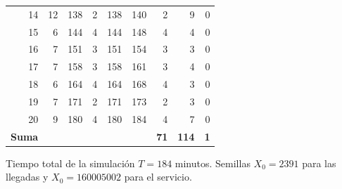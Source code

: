 \begin{table}[H]
\begin{tabular}{@{}rrrrrrrrr@{}}
14 & 12 & 138 & 2 & 138 & 140 & 2 & 9 & 0 \\
15 & 6 & 144 & 4 & 144 & 148 & 4 & 4 & 0 \\
16 & 7 & 151 & 3 & 151 & 154 & 3 & 3 & 0 \\
17 & 7 & 158 & 3 & 158 & 161 & 3 & 4 & 0 \\
18 & 6 & 164 & 4 & 164 & 168 & 4 & 3 & 0 \\
19 & 7 & 171 & 2 & 171 & 173 & 2 & 3 & 0 \\
20 & 9 & 180 & 4 & 180 & 184 & 4 & 7 & 0 \\
\midrule
\textbf{Suma} & & & & & & \textbf{71} & \textbf{114} & \textbf{1} \\
\bottomrule
\end{tabular}
\begin{minipage}{\textwidth}\vspace{2pt}\footnotesize
Tiempo total de la simulaci\'on $T = 184$ minutos. Semillas $X_0 = 2391$ para las llegadas y $X_0 = 160005002$ para el servicio.
\end{minipage}
\end{table}